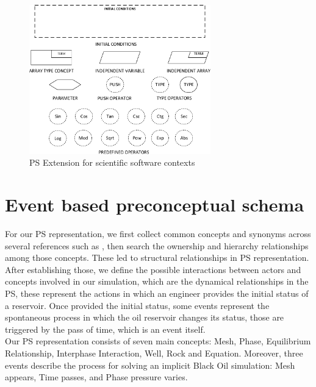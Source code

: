 \documentclass[review]{elsarticle}
\begin{document}
\begin{figure}
	\centering
	\includegraphics[width=0.7\textwidth]{Figures/PSNewElements.pdf}
	\caption{PS Extension for scientific software contexts \cite{zapata2013Eventos}}
	\label{fig:PS_Extended}
\end{figure}



\section{Event based preconceptual schema}\label{sec:representation}
For our PS representation, we first collect common concepts and synonyms across several references such as \cite{jamal2006petroleum,Bear2018,ertekin2001basic,Cao2002,Flemisch2011,HerreraCG2016,IsazaCN2017,Mohammad2017,MozoID2017,Qiao2017,cao2002development}, then search the ownership and hierarchy relationships among those concepts. These led to structural relationships in PS representation. After establishing those, we define the possible interactions between actors and concepts involved in our simulation, which are the dynamical relationships in the PS, these represent the actions in which an engineer provides the initial status of a reservoir. Once provided the initial status, some events represent the spontaneous process in which the oil reservoir changes its status, those are triggered by the pass of time, which is an event itself.\\ 
 
Our PS representation consists of seven main concepts: Mesh, Phase, Equilibrium Relationship, Interphase Interaction, Well, Rock and Equation. Moreover, three events describe the process for solving an implicit Black Oil simulation: Mesh appears, Time passes, and Phase pressure varies. 
\end{document}
